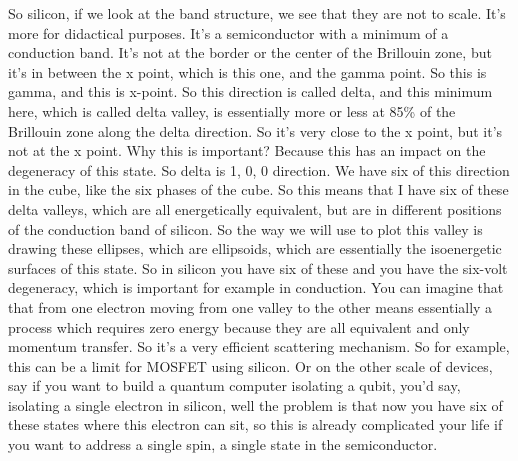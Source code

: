 So silicon, if we look at the band structure, we see that they are not to scale. It's more for didactical purposes. It's a semiconductor with a minimum of a conduction band. It's not at the border or the center of the Brillouin zone, but it's in between the x point, which is this one, and the gamma point. So this is gamma, and this is x-point. So this direction is called delta, and this minimum here, which is called delta valley, is essentially more or less at 85\% of the Brillouin zone along the delta direction. So it's very close to the x point, but it's not at the x point. Why this is important? Because this has an impact on the degeneracy of this state. So delta is 1, 0, 0 direction. We have six of this direction in the cube, like the six phases of the cube. So this means that I have six of these delta valleys, which are all energetically equivalent, but are in different positions of the conduction band of silicon. So the way we will use to plot this valley is drawing these ellipses, which are ellipsoids, which are essentially the isoenergetic surfaces of this state. So in silicon you have six of these and you have the six-volt degeneracy, which is important for example in conduction. You can imagine that that from one electron moving from one valley to the other means essentially a process which requires zero energy because they are all equivalent and only momentum transfer. So it's a very efficient scattering mechanism. So for example, this can be a limit for MOSFET using silicon. Or on the other scale of devices, say if you want to build a quantum computer isolating a qubit, you'd say, isolating a single electron in silicon, well the problem is that now you have six of these states where this electron can sit, so this is already complicated your life if you want to address a single spin, a single state in the semiconductor.
